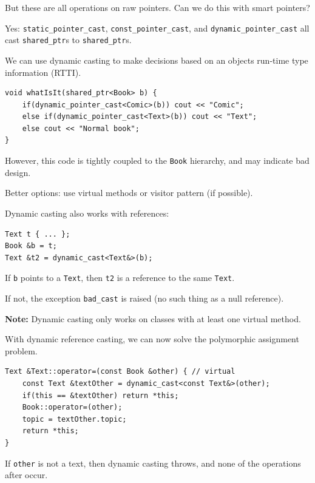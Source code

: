 \documentclass[11pt]{article}
\theoremstyle{definition}
\begin{document}
\begin{itemize}
\end{itemize}\vspace{-1.5ex}
But these are all operations on raw pointers. Can we do this with smart pointers?

Yes: {\tt static\_pointer\_cast}, {\tt const\_pointer\_cast}, and {\tt dynamic\_pointer\_cast} all cast {\tt shared\_ptr}s to {\tt shared\_ptr}s.

We can use dynamic casting to make decisions based on an objects run-time type information (RTTI).
\begin{lstlisting}
void whatIsIt(shared_ptr<Book> b) {
    if(dynamic_pointer_cast<Comic>(b)) cout << "Comic";
    else if(dynamic_pointer_cast<Text>(b)) cout << "Text";
    else cout << "Normal book";
}
\end{lstlisting}\vspace{-1.5ex}
However, this code is tightly coupled to the {\tt Book} hierarchy, and may indicate bad design. 

Better options: use virtual methods or visitor pattern (if possible).

Dynamic casting also works with references:
\begin{lstlisting}
Text t { ... };
Book &b = t;
Text &t2 = dynamic_cast<Text&>(b);
\end{lstlisting}\vspace{-1.5ex}
If {\tt b} points to a {\tt Text}, then {\tt t2} is a reference to the same {\tt Text}.

If not, the exception {\tt bad\_cast} is raised (no such thing as a null reference).

{\bf Note:} Dynamic casting only works on classes with at least one virtual method.

With dynamic reference casting, we can now solve the polymorphic assignment problem.
\begin{lstlisting}
Text &Text::operator=(const Book &other) { // virtual 
    const Text &textOther = dynamic_cast<const Text&>(other);
    if(this == &textOther) return *this;
    Book::operator=(other);
    topic = textOther.topic;
    return *this;
}
\end{lstlisting}\vspace{-1.5ex}
If {\tt other} is not a text, then dynamic casting throws, and none of the operations after occur. 

\newpage
\end{document}
